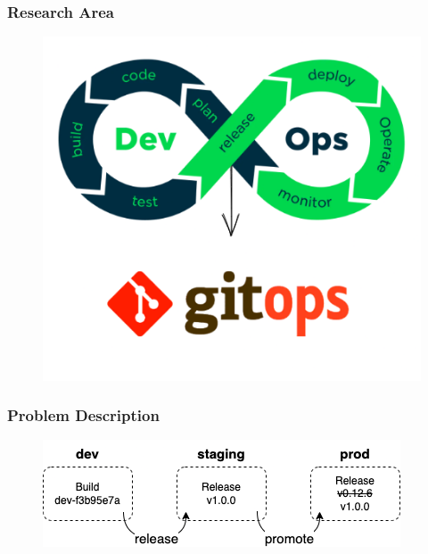 \documentclass{beamer}
\begin{document}
\begin{frame}
\frametitle{Research Area}
    
\begin{figure}[h]
	\centering
	\includegraphics[width=0.60\linewidth]{assets/devops-gitops.png}
	\label{fig:devopsGitOps}	
\end{figure}




\end{frame}

\begin{frame}
\frametitle{Problem Description}

\begin{figure}[h]
	\centering
	\includegraphics[width=.75\linewidth]{figures/release-promotion.drawio.png}
	\label{fig:releasePromotionProcess}	
\end{figure}




\end{frame}
\end{document}
